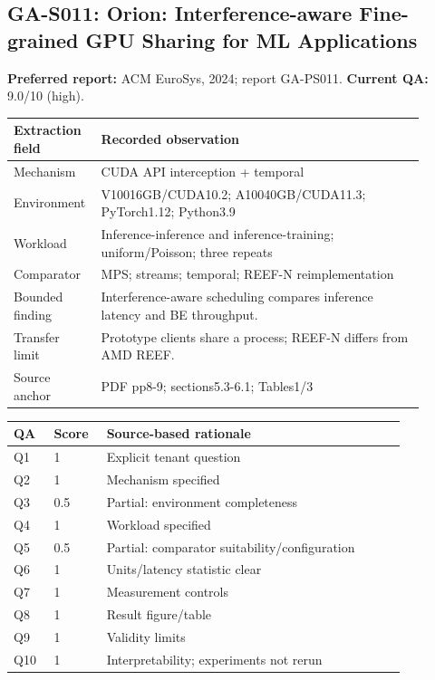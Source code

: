 \subsection{GA-S011: Orion: Interference-aware Fine-grained GPU Sharing for ML Applications}
\textbf{Preferred report:} ACM EuroSys, 2024; report GA-PS011. \textbf{Current QA:} 9.0/10 (high).
\begin{longtable}{P{0.15\linewidth}P{0.75\linewidth}}
\toprule Extraction field & Recorded observation\\\midrule\endhead
Mechanism & CUDA API interception + temporal\\
Environment & V10016GB/CUDA10.2; A10040GB/CUDA11.3; PyTorch1.12; Python3.9\\
Workload & Inference-inference and inference-training; uniform/Poisson; three repeats\\
Comparator & MPS; streams; temporal; REEF-N reimplementation\\
Bounded finding & Interference-aware scheduling compares inference latency and BE throughput.\\
Transfer limit & Prototype clients share a process; REEF-N differs from AMD REEF.\\
Source anchor & PDF pp8-9; sections5.3-6.1; Tables1/3\\
\bottomrule\end{longtable}
\begin{longtable}{P{0.09\linewidth}P{0.10\linewidth}P{0.67\linewidth}}
\toprule QA & Score & Source-based rationale\\\midrule\endhead
Q1 & 1 & Explicit tenant question\\
Q2 & 1 & Mechanism specified\\
Q3 & 0.5 & Partial: environment completeness\\
Q4 & 1 & Workload specified\\
Q5 & 0.5 & Partial: comparator suitability/configuration\\
Q6 & 1 & Units/latency statistic clear\\
Q7 & 1 & Measurement controls\\
Q8 & 1 & Result figure/table\\
Q9 & 1 & Validity limits\\
Q10 & 1 & Interpretability; experiments not rerun\\
\bottomrule\end{longtable}


